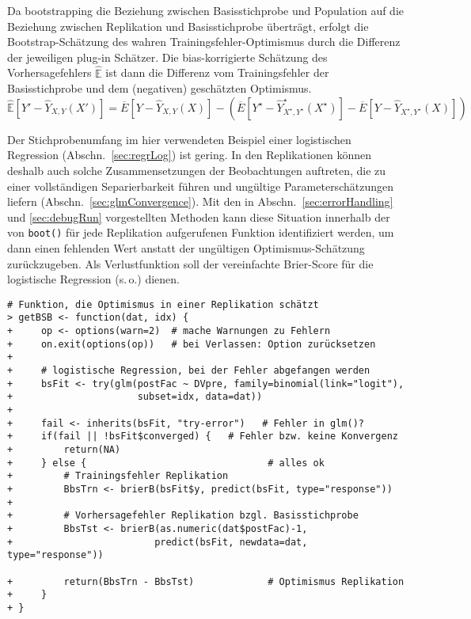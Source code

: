 Da bootstrapping die Beziehung zwischen Basisstichprobe und Population auf die Beziehung zwischen Replikation und Basisstichprobe überträgt, erfolgt die Bootstrap-Schätzung des wahren Trainingsfehler-Optimismus durch die Differenz der jeweiligen plug-in Schätzer. Die bias-korrigierte Schätzung des Vorhersagefehlers $\hat{\mathbb{E}}$ ist dann die Differenz vom Trainingsfehler der Basisstichprobe und dem (negativen) geschätzten Optimismus.
\begin{equation*}
\hat{\mathbb{E}}[Y' - \hat{Y}_{X, Y}(X')] = \overline{E}[Y - \hat{Y}_{X, Y}(X)] - (\overline{E}[Y^{\star} - \hat{Y}^{\star}_{X^{\star}, Y^{\star}}(X^{\star})] - \overline{E}[Y - \hat{Y}_{X^{\star}, Y^{\star}}(X)])
\end{equation*}

Der Stichprobenumfang im hier verwendeten Beispiel einer logistischen Regression (Abschn.\ \ref{sec:regrLog}) ist gering. In den Replikationen können deshalb auch solche Zusammensetzungen der Beobachtungen auftreten, die zu einer vollständigen Separierbarkeit führen und ungültige Parameterschätzungen liefern (Abschn.\ \ref{sec:glmConvergence}). Mit den in Abschn.\ \ref{sec:errorHandling} und \ref{sec:debugRun} vorgestellten Methoden kann diese Situation innerhalb der von \lstinline!boot()! für jede Replikation aufgerufenen Funktion identifiziert werden, um dann einen fehlenden Wert anstatt der ungültigen Optimismus-Schätzung zurückzugeben. Als Verlustfunktion soll der vereinfachte Brier-Score für die logistische Regression (s.\,o.) dienen.
\begin{lstlisting}
# Funktion, die Optimismus in einer Replikation schätzt
> getBSB <- function(dat, idx) {
+     op <- options(warn=2)  # mache Warnungen zu Fehlern
+     on.exit(options(op))   # bei Verlassen: Option zurücksetzen
+
+     # logistische Regression, bei der Fehler abgefangen werden
+     bsFit <- try(glm(postFac ~ DVpre, family=binomial(link="logit"),
+                      subset=idx, data=dat))
+
+     fail <- inherits(bsFit, "try-error")   # Fehler in glm()?
+     if(fail || !bsFit$converged) {   # Fehler bzw. keine Konvergenz
+         return(NA)
+     } else {                                # alles ok
+         # Trainingsfehler Replikation
+         BbsTrn <- brierB(bsFit$y, predict(bsFit, type="response"))
+
+         # Vorhersagefehler Replikation bzgl. Basisstichprobe
+         BbsTst <- brierB(as.numeric(dat$postFac)-1,
+                         predict(bsFit, newdata=dat, type="response"))

+         return(BbsTrn - BbsTst)             # Optimismus Replikation
+     }
+ }
\end{lstlisting}

